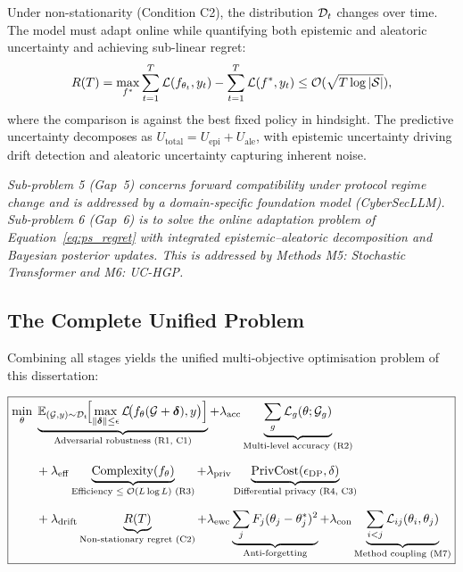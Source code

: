 Under non-stationarity (Condition C2), the distribution $\mathcal{D}_t$ changes over time. The model must adapt online while quantifying both epistemic and aleatoric uncertainty and achieving sub-linear regret:
\begin{equation}
R(T) = \max_{f^*}\sum_{t=1}^{T}\mathcal{L}(f_{\theta_t},y_t) - \sum_{t=1}^{T}\mathcal{L}(f^*,y_t) \le \mathcal{O}(\sqrt{T\log|\mathcal{S}|}),
\label{eq:ps_regret}
\end{equation}
where the comparison is against the best fixed policy in hindsight. The predictive uncertainty decomposes as $U_{\mathrm{total}} = U_{\mathrm{epi}} + U_{\mathrm{ale}}$, with epistemic uncertainty driving drift detection and aleatoric uncertainty capturing inherent noise.

\emph{Sub-problem 5 (Gap~5) concerns forward compatibility under protocol regime change and is addressed by a domain-specific foundation model (CyberSecLLM). Sub-problem 6 (Gap~6) is to solve the online adaptation problem of Equation~\eqref{eq:ps_regret} with integrated epistemic--aleatoric decomposition and Bayesian posterior updates. This is addressed by Methods M5: Stochastic Transformer and M6: UC-HGP.}

\subsection{The Complete Unified Problem}

Combining all stages yields the unified multi-objective optimisation problem of this dissertation:

\begin{equation}
\boxed{
\begin{aligned}
\min_\theta\;&
\underbrace{\mathbb{E}_{(\mathcal{G},y)\sim\mathcal{D}_t}\!\Bigl[
  \max_{\|\boldsymbol{\delta}\|\le\epsilon}
    \mathcal{L}\!\bigl(f_\theta(\mathcal{G}+\boldsymbol{\delta}),y\bigr)
\Bigr]}_{\text{Adversarial robustness (R1, C1)}}
+ \lambda_{\mathrm{acc}}\underbrace{\sum_g\mathcal{L}_g(\theta;\mathcal{G}_g)}_{\text{Multi-level accuracy (R2)}}
\\[6pt]
&+ \lambda_{\mathrm{eff}}\underbrace{\mathrm{Complexity}(f_\theta)}_{\text{Efficiency $\le\mathcal{O}(L\log L)$ (R3)}}
+ \lambda_{\mathrm{priv}}\underbrace{\mathrm{PrivCost}(\epsilon_{\mathrm{DP}},\delta)}_{\text{Differential privacy (R4, C3)}}
\\[6pt]
&+ \lambda_{\mathrm{drift}}\underbrace{R(T)}_{\text{Non-stationary regret (C2)}}
+ \lambda_{\mathrm{ewc}}\underbrace{\sum_j F_j(\theta_j-\theta_j^*)^2}_{\text{Anti-forgetting}}
+ \lambda_{\mathrm{con}}\underbrace{\sum_{i<j}\mathcal{L}_{ij}(\theta_i,\theta_j)}_{\text{Method coupling (M7)}}
\end{aligned}
}
\label{eq:ps_unified}
\end{equation}

